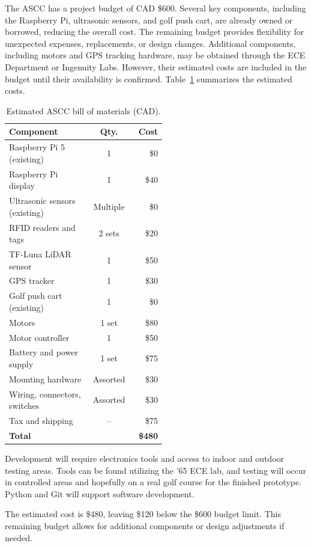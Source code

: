 
\label{sec:resources}

The ASCC has a project budget of CAD \$600. Several key components, including the Raspberry Pi, ultrasonic sensors, and golf push cart, are already owned or borrowed, reducing the overall cost. The remaining budget provides flexibility for unexpected expenses, replacements, or design changes. Additional components, including motors and GPS tracking hardware, may be obtained through the ECE Department or Ingenuity Labs. However, their estimated costs are included in the budget until their availability is confirmed. Table~\ref{tab:resource-budget} summarizes the estimated costs.


\begin{table}[H]
\centering
\caption{Estimated ASCC bill of materials (CAD).}
\label{tab:resource-budget}
\small
\begin{tabular}{p{0.52\linewidth} c r}
\hline
\textbf{Component} & \textbf{Qty.} & \textbf{Cost} \\
\hline
Raspberry Pi 5 (existing) & 1 & \$0 \\
Raspberry Pi display & 1 & \$40 \\
Ultrasonic sensors (existing) & Multiple & \$0 \\
RFID readers and tags & 2 sets & \$20 \\
TF-Luna LiDAR sensor & 1 & \$50 \\
GPS tracker & 1 & \$30 \\
Golf push cart (existing) & 1 & \$0 \\
Motors & 1 set & \$80 \\
Motor controller & 1 & \$50 \\
Battery and power supply & 1 set & \$75 \\
Mounting hardware & Assorted & \$30 \\
Wiring, connectors, switches & Assorted & \$30 \\
Tax and shipping & -- & \$75 \\
\hline
\textbf{Total} & & \textbf{\$480} \\
\hline
\end{tabular}
\end{table}


Development will require electronics tools and access to indoor and outdoor testing areas. Tools can be found utilizing the '65 ECE lab, and testing will occur in controlled areas and hopefully on a real golf course for the finished prototype. Python and Git will support software development.

The estimated cost is \$480, leaving \$120 below the \$600 budget limit. This remaining budget allows for additional components or design adjustments if needed.


\FloatBarrier